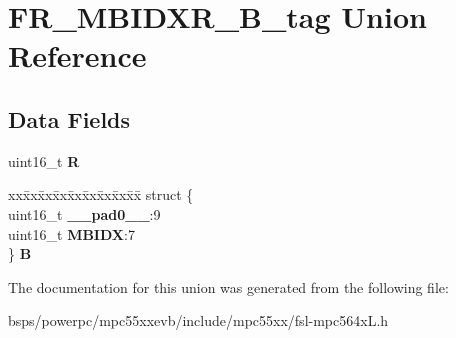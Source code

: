 \hypertarget{unionFR__MBIDXR__16B__tag}{}\section{F\+R\+\_\+\+M\+B\+I\+D\+X\+R\+\_\+B\+\_\+tag Union Reference}
\label{unionFR__MBIDXR__16B__tag}
\subsection*{Data Fields}
\begin{DoxyCompactItemize}
\item 
\mbox{\label{unionFR__MBIDXR__16B__tag_a579fa37edc9e98b391a3fb3ec267dc64}} 
uint16\+\_\+t {\bfseries R}
\item 
\mbox{\label{unionFR__MBIDXR__16B__tag_a7339fb59ed1bc892bd55c2452555ac54}} 
\begin{tabbing}
xx\=xx\=xx\=xx\=xx\=xx\=xx\=xx\=xx\=\kill
struct \{\\
\>uint16\_t {\bfseries \_\_pad0\_\_}:9\\
\>uint16\_t {\bfseries MBIDX}:7\\
\} {\bfseries B}\\

\end{tabbing}\end{DoxyCompactItemize}


The documentation for this union was generated from the following file\+:\begin{DoxyCompactItemize}
\item 
bsps/powerpc/mpc55xxevb/include/mpc55xx/fsl-\/mpc564x\+L.\+h\end{DoxyCompactItemize}
